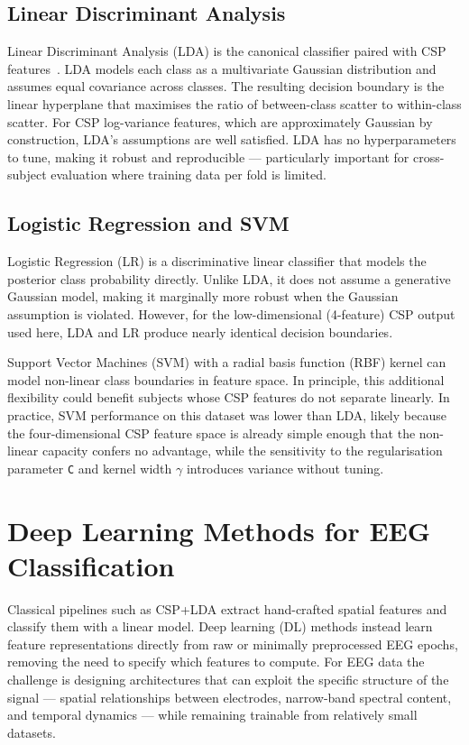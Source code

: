 \documentclass[english, bc, kiv, he, iso690alph, pdf]{fasthesis}
\begin{document}
\subsection{Linear Discriminant Analysis}

Linear Discriminant Analysis (LDA) is the canonical classifier paired with CSP features~\cite{lotte2018review}. LDA models each class as a multivariate Gaussian distribution and assumes equal covariance across classes. The resulting decision boundary is the linear hyperplane that maximises the ratio of between-class scatter to within-class scatter. For CSP log-variance features, which are approximately Gaussian by construction, LDA's assumptions are well satisfied. LDA has no hyperparameters to tune, making it robust and reproducible — particularly important for cross-subject evaluation where training data per fold is limited.

\subsection{Logistic Regression and SVM}

Logistic Regression (LR) is a discriminative linear classifier that models the posterior class probability directly. Unlike LDA, it does not assume a generative Gaussian model, making it marginally more robust when the Gaussian assumption is violated. However, for the low-dimensional (4-feature) CSP output used here, LDA and LR produce nearly identical decision boundaries.

Support Vector Machines (SVM) with a radial basis function (RBF) kernel can model non-linear class boundaries in feature space. In principle, this additional flexibility could benefit subjects whose CSP features do not separate linearly. In practice, SVM performance on this dataset was lower than LDA, likely because the four-dimensional CSP feature space is already simple enough that the non-linear capacity confers no advantage, while the sensitivity to the regularisation parameter \texttt{C} and kernel width $\gamma$ introduces variance without tuning.

\section{Deep Learning Methods for EEG Classification}

Classical pipelines such as CSP+LDA extract hand-crafted spatial features and classify them with a linear model. Deep learning (DL) methods instead learn feature representations directly from raw or minimally preprocessed EEG epochs, removing the need to specify which features to compute. For EEG data the challenge is designing architectures that can exploit the specific structure of the signal — spatial relationships between electrodes, narrow-band spectral content, and temporal dynamics — while remaining trainable from relatively small datasets.
\end{document}
